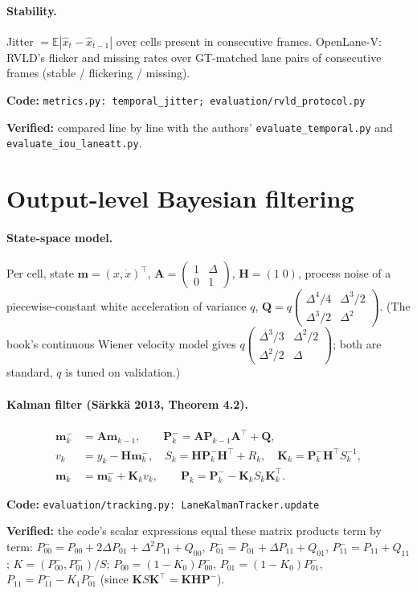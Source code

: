 \documentclass[10pt,a4paper]{article}
\newcommand{\code}[1]{\texttt{\small #1}}
\newcommand{\impl}[1]{\par\noindent\textcolor{blue!50!black}{\small\textbf{Code:} \texttt{#1}}\par}
\newcommand{\verif}[1]{\par\noindent\textcolor{green!35!black}{\small\textbf{Verified:} #1}\par}
\newcommand{\E}{\mathbb{E}}
\theoremstyle{definition}
\begin{document}
\paragraph{Stability.} Jitter $=\E|\hat x_t-\hat x_{t-1}|$ over cells present in consecutive frames. OpenLane-V:
RVLD's flicker and missing rates over GT-matched lane pairs of consecutive frames (stable / flickering / missing).
\impl{metrics.py: temporal\_jitter; evaluation/rvld\_protocol.py}
\verif{compared line by line with the authors' \code{evaluate\_temporal.py} and \code{evaluate\_iou\_laneatt.py}.}

\section{Output-level Bayesian filtering}
\paragraph{State-space model.} Per cell, state $\bm m=(x,\dot x)^\top$, $\bm A=\begin{pmatrix}1&\Delta\\0&1\end{pmatrix}$,
$\bm H=(1\;0)$, process noise of a piecewise-constant white acceleration of variance $q$,
$\bm Q=q\begin{pmatrix}\Delta^4/4&\Delta^3/2\\\Delta^3/2&\Delta^2\end{pmatrix}$. (The book's continuous Wiener velocity
model gives $q\begin{pmatrix}\Delta^3/3&\Delta^2/2\\\Delta^2/2&\Delta\end{pmatrix}$; both are standard, $q$ is tuned on
validation.)

\paragraph{Kalman filter (Särkkä 2013, Theorem 4.2).}
\begin{align}
\bm m^-_k&=\bm A\bm m_{k-1},\qquad \bm P^-_k=\bm A\bm P_{k-1}\bm A^\top+\bm Q,\\
v_k&=y_k-\bm H\bm m^-_k,\quad S_k=\bm H\bm P^-_k\bm H^\top+R_k,\quad \bm K_k=\bm P^-_k\bm H^\top S_k^{-1},\\
\bm m_k&=\bm m^-_k+\bm K_kv_k,\qquad \bm P_k=\bm P^-_k-\bm K_kS_k\bm K_k^\top.
\end{align}
\impl{evaluation/tracking.py: LaneKalmanTracker.update}
\verif{the code's scalar expressions equal these matrix products term by term:
$P^-_{00}=P_{00}+2\Delta P_{01}+\Delta^2P_{11}+Q_{00}$, $P^-_{01}=P_{01}+\Delta P_{11}+Q_{01}$,
$P^-_{11}=P_{11}+Q_{11}$; $K=(P^-_{00},P^-_{01})/S$; $P_{00}=(1-K_0)P^-_{00}$, $P_{01}=(1-K_0)P^-_{01}$,
$P_{11}=P^-_{11}-K_1P^-_{01}$ (since $\bm K S\bm K^\top=\bm K\bm H\bm P^-$).}
\end{document}
